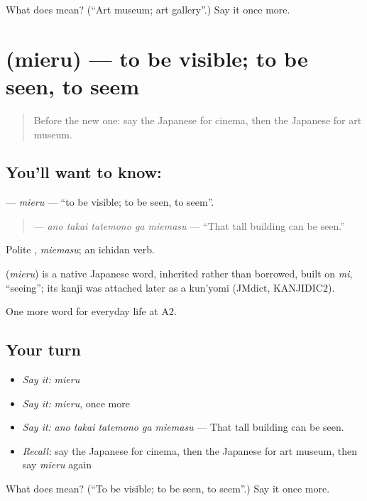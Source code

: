 \begin{tcolorbox}[breakable,colback=teal!4,colframe=teal!35!black,title={Before you move on}]
What does  mean? (\textquotedblleft{}Art museum; art gallery\textquotedblright{}.) Say it once more.
\end{tcolorbox}
\section[\texorpdfstring{\ja{みえる} (mieru)}{みえる (mieru)}]{ (mieru) — to be visible; to be seen, to seem}

\label{lesson:JA-C193-mieru}



\begin{quote}
Before the new one: say the Japanese for cinema, then the Japanese for art museum.
\end{quote}

\subsection*{You'll want to know: }
\textbf{} — \emph{mieru} — \textquotedblleft{}to be visible; to be seen, to seem\textquotedblright{}.

\begin{quote}
\textbf{   } — \emph{ano takai tatemono ga miemasu} — \textquotedblleft{}That tall building can be seen.\textquotedblright{}
\end{quote}

Polite \textbf{}, \emph{miemasu}; an ichidan verb.

\begin{cousinweb}
\textbf{} (\emph{mieru}) is a native Japanese word, inherited rather than borrowed, built on \emph{mi}, \textquotedblleft{}seeing\textquotedblright{}; its kanji was attached later as a kun'yomi (JMdict, KANJIDIC2).
\end{cousinweb}

\begin{grammarlens}[title={What you've built}]
One more word for everyday life at A2.
\end{grammarlens}

\subsection*{Your turn}
\begin{itemize}
\raggedright
  \item \emph{Say it:} \emph{mieru}
  \item \emph{Say it:} \emph{mieru}, once more
  \item \emph{Say it:} \emph{ano takai tatemono ga miemasu} — That tall building can be seen.
  \item \emph{Recall:} say the Japanese for cinema, then the Japanese for art museum, then say \emph{mieru} again
\end{itemize}

\begin{tcolorbox}[breakable,colback=teal!4,colframe=teal!35!black,title={Before you move on}]
What does  mean? (\textquotedblleft{}To be visible; to be seen, to seem\textquotedblright{}.) Say it once more.
\end{tcolorbox}
